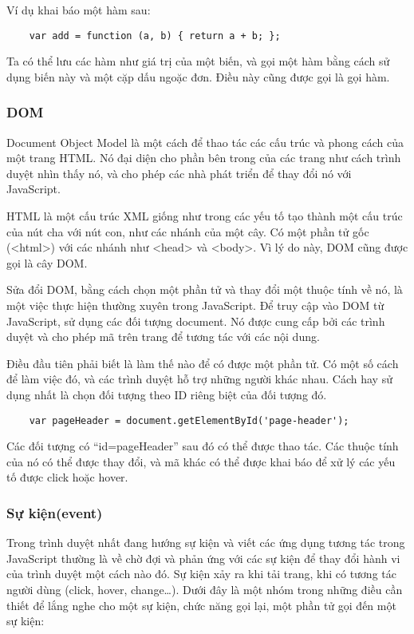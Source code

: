 Ví dụ khai báo một hàm sau:  

\begin{lstlisting}
	var add = function (a, b) { return a + b; }; 
\end{lstlisting}

Ta có thể lưu các hàm như giá trị của một biến, và gọi một hàm bằng cách sử dụng biến này và một cặp dấu ngoặc đơn. Điều này cũng được gọi là gọi hàm.

\subsubsection{DOM}

Document Object Model là một cách để thao tác các cấu trúc và phong cách của một trang HTML. Nó đại diện cho phần bên trong của các trang như cách trình duyệt nhìn thấy nó, và cho phép các nhà phát triển để thay đổi nó với JavaScript.

HTML là một cấu trúc XML giống như trong các yếu tố tạo thành một cấu trúc của nút cha với nút con, như các nhánh của một cây. Có một phần tử gốc (<html>) với các nhánh như <head> và <body>. Vì lý do này, DOM cũng được gọi là cây DOM.

Sửa đổi DOM, bằng cách chọn một phần tử và thay đổi một thuộc tính về nó, là một việc thực hiện thường xuyên trong JavaScript. Để truy cập vào DOM từ JavaScript, sử dụng các đối tượng document. Nó được cung cấp bởi các trình duyệt và cho phép mã trên trang để tương tác với các nội dung.

Điều đầu tiên phải biết là làm thế nào để có được một phần tử. Có một số cách để làm việc đó, và các trình duyệt hỗ trợ những người khác nhau. Cách hay sử dụng nhất là chọn đối tượng theo ID riêng biệt của đối tượng đó.

\begin{lstlisting}
	var pageHeader = document.getElementById('page-header');
\end{lstlisting}

Các đối tượng có “id=pageHeader” sau đó có thể được thao tác. Các thuộc tính của nó có thể được thay đổi, và mã khác có thể được khai báo để xử lý các yếu tố được click hoặc hover.


\subsubsection{Sự kiện(event)}

Trong trình duyệt nhất đang hướng sự kiện và viết các ứng dụng tương tác trong JavaScript thường là về chờ đợi và phản ứng với các sự kiện để thay đổi hành vi của trình duyệt một cách nào đó. Sự kiện xảy ra khi tải trang, khi có tương tác người dùng (click, hover, change…). Dưới đây là một nhóm trong những điều cần thiết để lắng nghe cho một sự kiện, chức năng gọi lại, một phần tử gọi đến một sự kiện:
 
